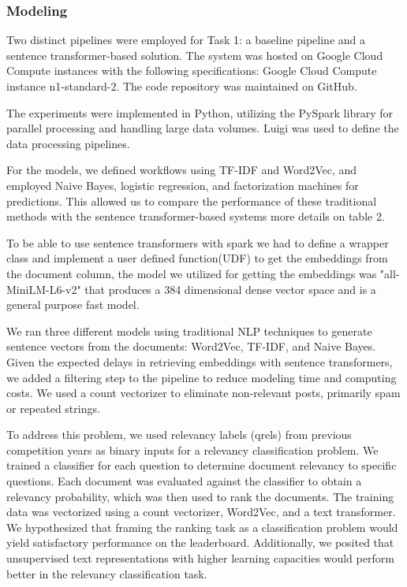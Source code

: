 \documentclass[]{style/ceurart}
\begin{document}
\subsubsection{Modeling}

Two distinct pipelines were employed for Task 1: a baseline pipeline and a sentence transformer-based solution. The system was hosted on Google Cloud Compute instances with the following specifications: Google Cloud Compute instance n1-standard-2. The code repository was maintained on GitHub.

The experiments were implemented in Python, utilizing the PySpark library for parallel processing and handling large data volumes. Luigi\cite{noauthor_getting_nodate} was used to define the data processing pipelines. 

For the models, we defined workflows using TF-IDF and Word2Vec, and employed Naive Bayes, logistic regression, and factorization machines for predictions. This allowed us to compare the performance of these traditional methods with the sentence transformer-based systems \cite{reimers_sentence-bert_2019} more details on table 2.

To be able to use sentence transformers with spark we had to define a wrapper class and implement a user defined function(UDF) to get the embeddings from the document column, the model we utilized for getting the embeddings was "all-MiniLM-L6-v2" that produces a 384 dimensional dense vector space and is a general purpose fast model\cite{noauthor_sentence-transformersall-minilm-l6-v2_nodate}.

We ran three different models using traditional NLP techniques to generate sentence vectors from the documents: Word2Vec, TF-IDF, and Naive Bayes. Given the expected delays in retrieving embeddings with sentence transformers, we added a filtering step to the pipeline to reduce modeling time and computing costs. We used a count vectorizer to eliminate non-relevant posts, primarily spam or repeated strings.

To address this problem, we used relevancy labels (qrels) from previous competition years as binary inputs for a relevancy classification problem. We trained a classifier for each question to determine document relevancy to specific questions. Each document was evaluated against the classifier to obtain a relevancy probability, which was then used to rank the documents. The training data was vectorized using a count vectorizer, Word2Vec, and a text transformer. We hypothesized that framing the ranking task as a classification problem would yield satisfactory performance on the leaderboard. Additionally, we posited that unsupervised text representations with higher learning capacities would perform better in the relevancy classification task.
\end{document}
